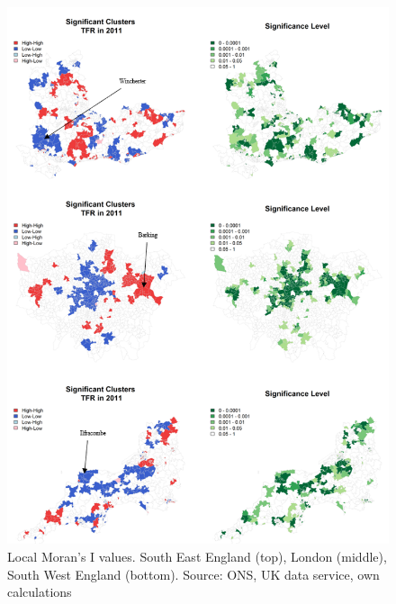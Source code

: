\documentclass[12pt,twoside]{reedthesis}
\begin{document}
\begin{figure}
\includegraphics[width=0.95\linewidth]{figure/Figure_12} \caption{Local Moran's I values. South East England (top), London (middle), South West England (bottom). Source: ONS, UK data service, own calculations}\label{fig:figure12}
\end{figure}
\end{document}

